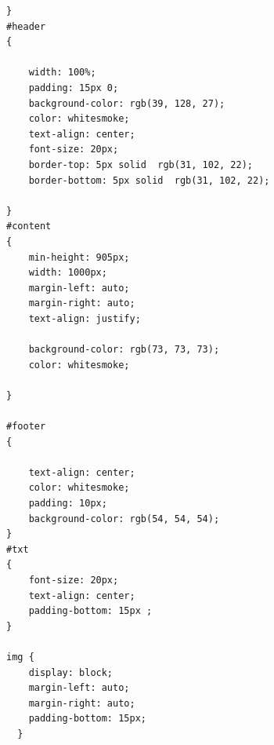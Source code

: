 \documentclass[12pt,a4paper]{article}
\begin{document}
\begin{itemize}
\begin{lstlisting}
}
#header
{
    
    width: 100%;
    padding: 15px 0;
    background-color: rgb(39, 128, 27);
    color: whitesmoke;
    text-align: center;
    font-size: 20px;
    border-top: 5px solid  rgb(31, 102, 22);
    border-bottom: 5px solid  rgb(31, 102, 22);

}
#content
{
    min-height: 905px;
    width: 1000px;
    margin-left: auto;
    margin-right: auto;
    text-align: justify;
    
    background-color: rgb(73, 73, 73);
    color: whitesmoke;
    
}

#footer
{
   
    text-align: center;
    color: whitesmoke;
    padding: 10px;
    background-color: rgb(54, 54, 54);
}
#txt
{
    font-size: 20px;
    text-align: center;
    padding-bottom: 15px ;
}

img {
    display: block;
    margin-left: auto;
    margin-right: auto;
    padding-bottom: 15px;
  }
	\end{lstlisting}
	\end{itemize}
\end{document}
